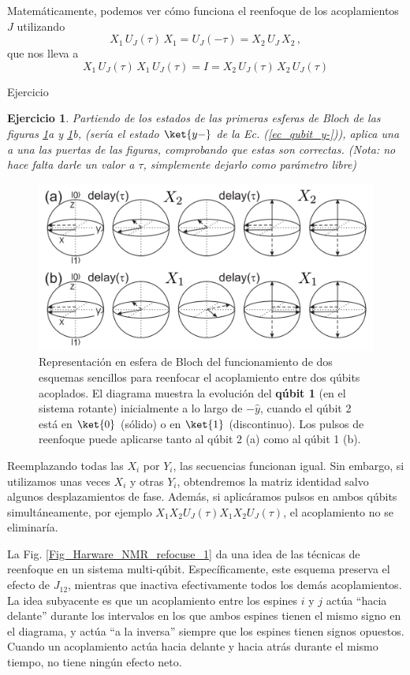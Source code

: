 \documentclass[a4paper,11pt]{book} %
\newtheorem{ejercicio_contador}{Ejercicio}
\newcommand{\Ejercicio}[1]{
		\begin{mybox_gray}{Ejercicio} 
			\begin{ejercicio_contador}
				 #1 
			\end{ejercicio_contador} 
		\end{mybox_gray}
	}
\numberwithin{equation}{chapter}
\begin{document}
Matemáticamente, podemos ver cómo funciona el reenfoque de los acoplamientos $J$ utilizando 
	\begin{equation}
	X_1 \, U_J(\tau) \, X_1 = U_J (- \tau) = X_2 \, U_J \, X_2 \, ,
	\end{equation}
que nos lleva a 
	\begin{equation}
	 X_1 \, U_J(\tau) \, X_1 \, U_J(\tau) = I =  X_2 \, U_J(\tau) \, X_2 \, U_J(\tau)
	\end{equation}

	\Ejercicio{Partiendo de los estados de las primeras esferas de Bloch de las figuras  \ref{Fig_Harware_NMR_refocusing}a y \ref{Fig_Harware_NMR_refocusing}b, (sería el estado $\ket{y-}$ de la Ec.    (\ref{ec_qubit_y-})), aplica una a una las puertas de las figuras, comprobando que estas son correctas. (Nota: no hace falta darle un valor a $\tau$, simplemente dejarlo como parámetro libre)}



	\begin{figure}[t]
	\centering 
	\includegraphics[width=0.7\linewidth]{Figuras/Fig_Harware_NMR_refocusing}
	\caption{Representación en esfera de Bloch del funcionamiento de dos esquemas sencillos para reenfocar el acoplamiento entre dos qúbits acoplados. El diagrama muestra la evolución del \textbf{qúbit 1} (en el sistema rotante) inicialmente a lo largo de $- \hat{y}$, cuando el qúbit 2 está en $\ket{0}$ (sólido) o en $\ket{1}$ (discontinuo). Los pulsos de reenfoque puede aplicarse tanto al  qúbit 2 (a) como al qúbit 1 (b).}
	\label{Fig_Harware_NMR_refocusing}
	\end{figure}


Reemplazando todas las $X_i$ por $Y_i$, las secuencias funcionan igual. Sin embargo, si utilizamos unas veces $X_i$ y otras $Y_i$, obtendremos la matriz identidad salvo algunos desplazamientos de fase. Además, si aplicáramos pulsos en ambos qúbits simultáneamente, por ejemplo $X_1X_2 U_J(\tau)X_1 X_2 U_J(\tau)$, el acoplamiento no se eliminaría. 

La Fig. \ref{Fig_Harware_NMR_refocuse_1} da una idea de las técnicas de reenfoque en un sistema multi-qúbit. Específicamente, este esquema preserva el efecto de $J_{12}$, mientras que inactiva efectivamente todos los demás acoplamientos. La idea subyacente es que un acoplamiento entre los espines $i$ y $j$ actúa ``hacia delante'' durante los intervalos en los que ambos espines tienen el mismo signo en el diagrama, y actúa ``a la inversa'' siempre que los espines tienen signos opuestos. Cuando un acoplamiento actúa hacia delante y hacia atrás durante el mismo tiempo, no tiene ningún efecto neto.
\end{document}
